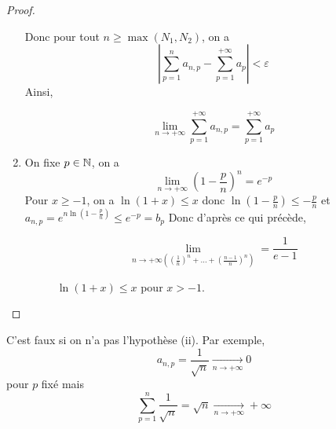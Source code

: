 \begin{proof}
\begin{enumerate}
		Donc pour tout $n\geqslant\max\left(N_{1},N_{2}\right)$, on a 
		\begin{equation}\left\lvert\sum_{p=1}^{n}a_{n,p}-\sum_{p=1}^{+\infty}a_{p}\right\rvert<\varepsilon\end{equation}
		Ainsi,

		\begin{equation}\boxed{\lim\limits_{n\to+\infty}\sum_{p=1}^{+\infty}a_{n,p}=\sum_{p=1}^{+\infty}a_{p}}\end{equation}

		\item On fixe $p\in\mathbb{N}$, on a 
		\begin{equation}\lim\limits_{n\to+\infty}\left(1-\frac{p}{n}\right)^{n}=e^{-p}\end{equation}
		Pour $x\geqslant -1$, on a $\ln\left(1+x\right)\leqslant x$ donc $\ln\left(1-\frac{p}{n}\right)\leqslant -\frac{p}{n}$ et $a_{n,p}=e^{n\ln\left(1-\frac{p}{n}\right)}\leqslant e^{-p}=b_{p}$
		Donc d'après ce qui précède, 
		
		\begin{equation}\boxed{\lim\limits_{n\to+\infty\left(\left(\frac{1}{n}\right)^{n}+\dots+\left(\frac{n-1}{n}\right)^{n}\right)}=\frac{1}{e-1}}\end{equation}
		
		\begin{figure}[ht!]
			\centering
			\caption{$\ln\left(1+x\right)\leqslant x$ pour $x>-1$.}
		\end{figure}
	\end{enumerate}
\end{proof}

\begin{remark}
	C'est faux si on n'a pas l'hypothèse (ii). Par exemple, 
	\begin{equation}a_{n,p}=\frac{1}{\sqrt{n}}\xrightarrow[n\to+\infty]{}0\end{equation}
	pour $p$ fixé mais 
	\begin{equation}\sum_{p=1}^{n}\frac{1}{\sqrt{n}}=\sqrt{n}\xrightarrow[n\to+\infty]{}+\infty\end{equation}
\end{remark}

